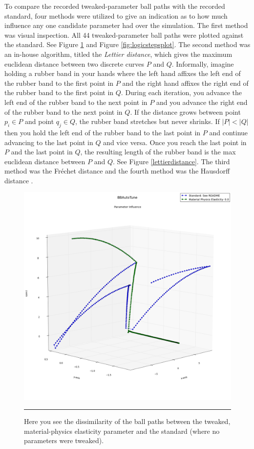 To compare the recorded tweaked-parameter ball paths with the recorded standard, four methods were utilized to give an indication as to how much influence any one candidate parameter had over the simulation. The first method was visual inspection. All 44 tweaked-parameter ball paths were plotted against the standard. See Figure \ref{fig:matphysplot} and Figure \ref{fig:logicstepsplot}. The second method was an in-house algorithm, titled the \textit{Lettier distance}, which gives the maximum euclidean distance between two discrete curves $P$ and $Q$. Informally, imagine holding a rubber band in your hands where the left hand affixes the left end of the rubber band to the first point in $P$ and the right hand affixes the right end of the rubber band to the first point in $Q$. During each iteration, you advance the left end of the rubber band to the next point in $P$ and you advance the right end of the rubber band to the next point in $Q$. If the distance grows between point $p_i\in P$ and point $q_j \in Q$, the rubber band stretches but never shrinks. If $|P|<|Q|$ then you hold the left end of the rubber band to the last point in $P$ and continue advancing to the last point in $Q$ and vice versa. Once you reach the last point in $P$ and the last point in $Q$, the resulting length of the rubber band is the max euclidean distance between $P$ and $Q$. See Figure \ref{lettierdistance}. The third method was the Fréchet distance and the fourth method was the Hausdorff distance \cite{frechet} \cite{hausdorff}.

\begin{figure}[htbp]
\centering
\includegraphics[scale=0.35]{../Figures/Chapter4/material_physics_ball_plot.png}
\rule{35em}{0.5pt}
\caption[Physics Engine Racquetball Path Dissimilarity]{Here you see the dissimilarity of the ball paths between the tweaked, material-physics elasticity parameter and the standard (where no parameters were tweaked).}
\label{fig:matphysplot}
\end{figure}

